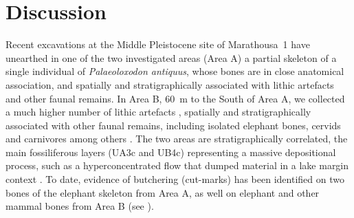 \documentclass[preprint,authoryear,times]{elsarticle} %
\begin{document}


\section{Discussion}

Recent excavations at the Middle Pleistocene site of Marathousa~1 have unearthed in one of the two investigated areas (Area A) a partial skeleton of a single individual of \emph{Palaeoloxodon antiquus}, whose bones are in close anatomical association, and spatially and stratigraphically associated with lithic artefacts and other faunal remains. In Area B, 60~m to the South of Area A, we collected a much higher number of lithic artefacts \citep{Tourloukis}, spatially and stratigraphically associated with other faunal remains, including isolated elephant bones, cervids and carnivores among others \citep{Konidaris}. The two areas are stratigraphically correlated, the main fossiliferous layers (UA3c and UB4c) representing a massive depositional process, such as a hyperconcentrated flow that dumped material in a lake margin context \citep{Karkanas}. To date, evidence of butchering (cut-marks) has been identified on two bones of the elephant skeleton from Area A, as well on elephant and other mammal bones from Area B (see \cite{Konidaris}).
\end{document}

